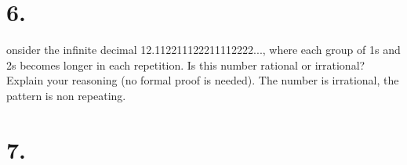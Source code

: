 \documentclass{article}
\begin{document}
\section*{6.}
onsider the infinite decimal 12.112211122211112222..., where each group 
of 1s and 2s becomes longer in each repetition. Is this number rational
or irrational? Explain your reasoning (no formal proof is needed).
The number is irrational, the pattern is non repeating.

\section*{7.}
\end{document}
